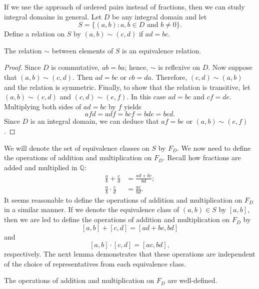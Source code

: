 If we use the approach of ordered pairs instead of fractions, then we can study integral domains in general.  Let $D$ be any integral domain and let 
\[
S = \{ (a, b) : a, b \in D \mbox{ and } b \neq 0 \}.
\]
Define a relation on $S$ by $(a, b) \sim (c, d)$ if $ad=bc$.

\begin{lemma}
The relation $\sim$ between elements of $S$ is an equivalence relation. 
\end{lemma}
 
\begin{proof}
Since $D$ is commutative, $ab = ba$; hence, $\sim$ is reflexive on $D$.
Now suppose that $(a,b) \sim (c,d)$. Then $ad=bc$ or $cb = da$.
Therefore, $(c,d) \sim (a, b)$ and the relation is symmetric. Finally,
to show that the relation is transitive, let $(a, b) \sim (c, d)$ and
$(c, d) \sim (e,f)$. In this case $ad=bc$ and $cf = de$. Multiplying
both sides of $ad=bc$ by $f$ yields
\[
a f d = a d f = b c f = b d e = bed.
\]
Since $D$ is an integral domain, we can deduce that $af = be$ or 
$(a,b ) \sim (e, f)$. \mbox{\hspace{1in}}
\end{proof}
 

\medskip
 

We will denote the set of equivalence classes on $S$ by $F_D$. We now
need to define the operations of addition and multiplication on
$F_D$.  Recall how fractions are added and multiplied in ${\mathbb
Q}$:
\begin{align*}
\frac{a}{b} + \frac{c}{d} & = \frac{ad + b c}{b d}; \\
\frac{a}{b} \cdot \frac{c}{d} & = \frac{ac}{b d}.
\end{align*}
It seems reasonable to define the operations of addition and
multiplication on $F_D$ in a similar manner.  If we denote the
equivalence class of $(a, b) \in S$ by $[a, b]$, then we are led to
define the operations of addition and multiplication on $F_D$ by
\[
[a, b] + [c, d] = [ad + b c,b d]
\]
and
\[
[a, b] \cdot [c, d] = [ac, b d],
\]
respectively.  The next lemma demonstrates that these operations are
independent of the choice of representatives from each equivalence
class.
 
 
\begin{lemma}
The operations of addition and multiplication on $F_D$ are well-defined.
\end{lemma}
 

